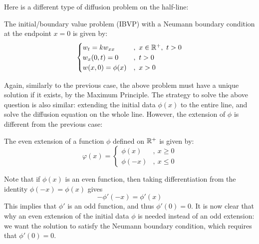 Here is a different type of diffusion problem on the half-line:

\medskip 

\begin{defn} 
    The initial/boundary value problem (IBVP) with a Neumann boundary condition at the endpoint $x=0$ is given by:
    \[\begin{cases}
        w_t = k w_{xx} &,\ x\in{\mathbb R}^+,\ t > 0 \\
        w_x(0,t) = 0 &,\ t > 0 \\
        w(x,0) = \phi(x) &,\ x > 0
    \end{cases}\]
\end{defn}
Again, similarly to the previous case, the above problem must have a unique solution if it exists, by the Maximum Principle. The strategy to solve the above question is also similar: extending the initial data $\phi(x)$ to the entire line, and solve the diffusion equation on the whole line. However, the extension of $\phi$ is different from the previous case:

\medskip

\begin{defn} 
    The even extension of a function $\phi$ defined on ${\mathbb R}^+$ is given by:
    \[\varphi(x) = \begin{cases}
        \phi(x) &,\ x\geq0\\
        \phi(-x) &,\ x\leq 0
    \end{cases}\]
\end{defn}

Note that if $\phi(x)$ is an even function, then taking differentiation from the identity $\phi(-x) = \phi(x)$ gives 
\[-\phi'(-x) = \phi'(x)\]
This implies that $\phi'$ is an odd function, and thus $\phi'(0)=0$. It is now clear that why an even extension of the initial data $\phi$ is needed instead of an odd extension: we want the solution to satisfy the Neumann boundary condition, which requires that $\phi'(0)=0$.

\medskip 

